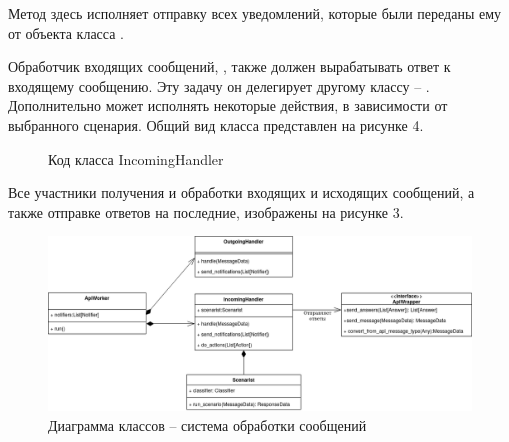    Метод  здесь исполняет отправку всех уведомлений,
    которые были переданы ему от объекта класса .

    Обработчик входящих сообщений, ,
    также должен вырабатывать ответ к входящему сообщению. 
    Эту задачу он делегирует другому классу -- . 
    Дополнительно  может исполнять некоторые
    действия, в зависимости от выбранного сценария.
    Общий вид класса представлен на рисунке 4.
    \begin{figure}[H]
        \centering
        
        \caption{Код класса IncomingHandler}
        \label{fig:incoming_handler}
    \end{figure}

    Все участники получения и обработки входящих и исходящих сообщений, а также
    отправке ответов на последние, изображены на рисунке 3.
    \begin{figure}[H]
        \centering
        \includegraphics[width=\linewidth]{static/ClassDiagram_ioprocess.png}
        \caption{Диаграмма классов -- система обработки сообщений}
        \label{fig:class-diagram-ioprocess}
    \end{figure}


